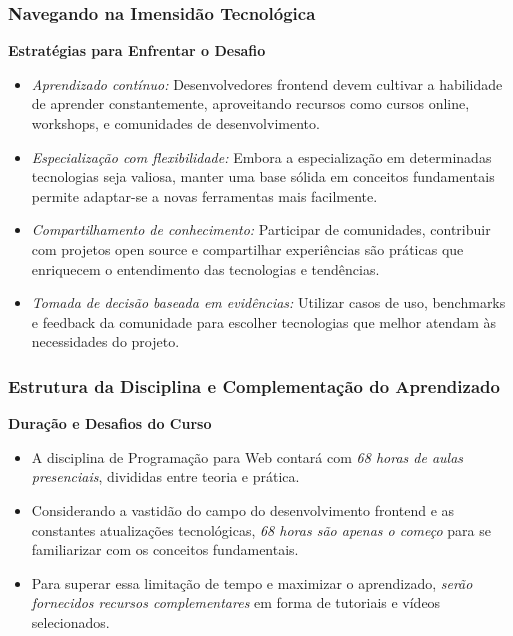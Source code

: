 \begin{frame}[fragile]
  \frametitle{Navegando na Imensidão Tecnológica}
  \textbf{Estratégias para Enfrentar o Desafio}
  \begin{itemize}
    \item \textit{Aprendizado contínuo:} Desenvolvedores frontend devem cultivar a habilidade de aprender constantemente, aproveitando recursos como cursos online, workshops, e comunidades de desenvolvimento.
    \item \textit{Especialização com flexibilidade:} Embora a especialização em determinadas tecnologias seja valiosa, manter uma base sólida em conceitos fundamentais permite adaptar-se a novas ferramentas mais facilmente.
    \item \textit{Compartilhamento de conhecimento:} Participar de comunidades, contribuir com projetos open source e compartilhar experiências são práticas que enriquecem o entendimento das tecnologias e tendências.
    \item \textit{Tomada de decisão baseada em evidências:} Utilizar casos de uso, benchmarks e feedback da comunidade para escolher tecnologias que melhor atendam às necessidades do projeto.
  \end{itemize}
\end{frame}
\begin{frame}[fragile]
  \frametitle{Estrutura da Disciplina e Complementação do Aprendizado}
  \textbf{Duração e Desafios do Curso}
  \begin{itemize}
    \item A disciplina de Programação para Web contará com \textit{68 horas de aulas presenciais}, divididas entre teoria e prática.
    \item Considerando a vastidão do campo do desenvolvimento frontend e as constantes atualizações tecnológicas, \textit{68 horas são apenas o começo} para se familiarizar com os conceitos fundamentais.
    \item Para superar essa limitação de tempo e maximizar o aprendizado, \textit{serão fornecidos recursos complementares} em forma de tutoriais e vídeos selecionados.
  \end{itemize}
\end{frame}


